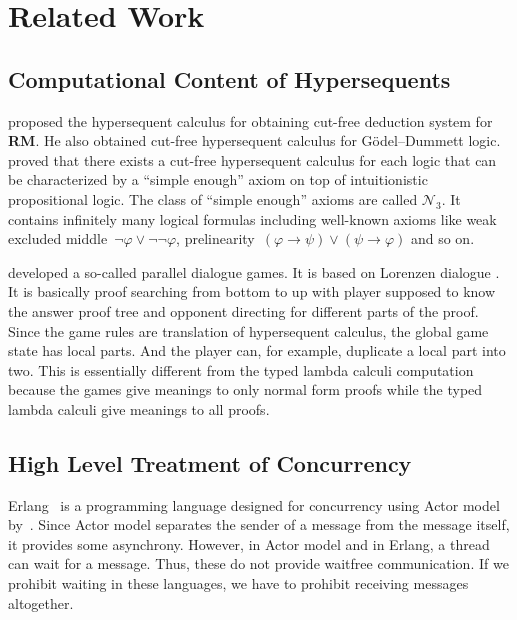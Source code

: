 \section{Related Work}

\subsection{Computational Content of Hypersequents}

\citet{RM} proposed the hypersequent calculus for obtaining
cut-free deduction system for \textbf{RM}.
He also obtained cut-free hypersequent calculus for G\"odel--Dummett
logic.
\citet*{agt08} proved that there exists a cut-free hypersequent calculus
for each logic that can be characterized by a ``simple enough'' axiom on
top of intuitionistic propositional logic.  The class of ``simple
enough'' axioms are called $\mathcal N_3$.  It contains infinitely many
logical formulas including well-known axioms like weak excluded
middle~$\neg\varphi\vee\neg\neg\varphi$,
prelinearity~$(\varphi\rightarrow\psi)\vee(\psi\rightarrow\varphi)$ and so on.

\citet{parallel} developed a so-called parallel dialogue games.  It is
based on Lorenzen dialogue .  It is basically proof searching from
bottom to up with player supposed
to know the answer proof tree and opponent directing for different parts
of the proof.  Since the game rules are translation of hypersequent
calculus, the global game state has local parts.  And the player can,
for example, duplicate a local part into two.  This is essentially
different from the typed lambda calculi computation because the games
give meanings to only normal form proofs while the typed lambda calculi
give meanings to all proofs.

\subsection{High Level Treatment of Concurrency}

Erlang~\citep{erlang} is a programming language designed for concurrency
using Actor
model by~\citet{actor}.
Since Actor model separates the sender of a message from the message
itself, it provides some asynchrony.  However, in Actor model and in
Erlang, a thread can wait for a message.  Thus, these do not provide
waitfree communication.  If we prohibit waiting in these languages,
we have to prohibit
receiving messages altogether.


